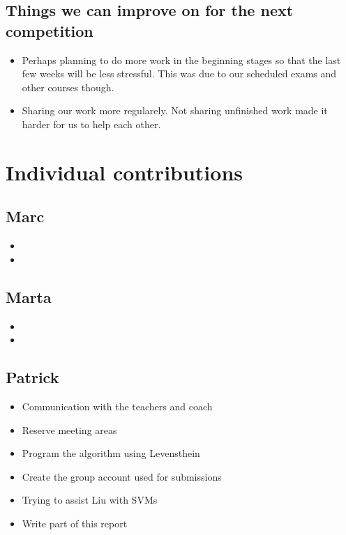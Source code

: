 \documentclass{article}
\begin{document}
\subsection{Things we can improve on for the next competition}

\begin{itemize}
\item Perhaps planning to do more work in the beginning stages so that the last few weeks will be less stressful. This was due to our scheduled exams and other courses though.
\item Sharing our work more regularely. Not sharing unfinished work made it harder for us to help each other.
\end{itemize}

\section{Individual contributions}

\subsection{Marc}

\begin{itemize}
\item
\item
\end{itemize}

\subsection{Marta}

\begin{itemize}
\item
\item
\end{itemize}

\subsection{Patrick}

\begin{itemize}
\item Communication with the teachers and coach
\item Reserve meeting areas
\item Program the algorithm using Levensthein
\item Create the group account used for submissions
\item Trying to assist Liu with SVMs
\item Write part of this report
\end{itemize}
\end{document}
